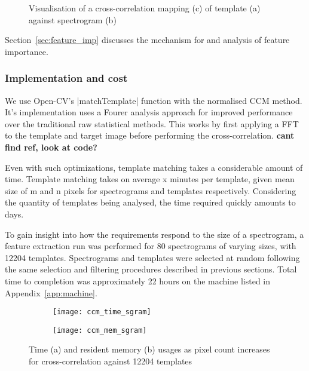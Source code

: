 \begin{figure}[t!]
  \centering
  \begin{subfigure}[t]{0.5\textwidth}
    \centering
    \caption{}
  \end{subfigure}
  \begin{subfigure}[t]{0.5\textwidth}
    \centering
    \caption{}
  \end{subfigure}
  \begin{subfigure}[t]{0.5\textwidth}
    \centering
    \caption{}
  \end{subfigure}
  \caption{Visualisation of a cross-correlation mapping (c) of template (a) against
  spectrogram (b)}
  \label{fig:ccm}
\end{figure}

Section~\ref{sec:feature_imp} discusses the mechanism for and analysis of feature
importance.

\subsubsection{Implementation and cost}
We use Open-CV's |matchTemplate| function with the normalised CCM method.
It's implementation uses a Fourer analysis approach for improved performance over
the traditional raw statistical methods.
This works by first applying a FFT to the template and target image before
performing the cross-correlation.
\textbf{cant find ref, look at code?}

Even with such optimizations, template matching takes a considerable amount of
time.
Template matching takes on average x minutes per template, given
mean size of m and n pixels for spectrograms and templates respectively.
Considering the quantity of templates being analysed, the time required quickly
amounts to days.

To gain insight into how the requirements respond to the size of a
spectrogram, a feature extraction run was performed for 80 spectrograms of
varying sizes, with 12204 templates.
Spectrograms and templates were selected at random following the same selection
and filtering procedures described in previous sections.
Total time to completion was approximately 22 hours on the machine listed in
Appendix~\ref{app:machine}.\\

\begin{figure}[!htb]
  \centering
  \begin{subfigure}[b]{0.5\textwidth}
    \centering
    \texttt{[image: ccm\_time\_sgram]}
    \caption{}
  \end{subfigure}%
  \begin{subfigure}[b]{0.5\textwidth}
    \centering
    \texttt{[image: ccm\_mem\_sgram]}
    \caption{}
  \end{subfigure}
  \caption{Time (a) and resident memory (b) usages as pixel count increases for
  cross-correlation against 12204 templates}
\end{figure}

